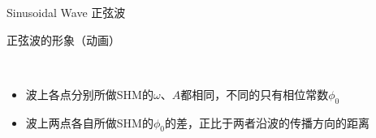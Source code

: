 \documentclass{beamer}
\begin{document}
\begin{frame}{Sinusoidal Wave 正弦波}
	\begin{block}{正弦波的形象（动画）}
		\begin{center}
		\href{run:./LectureNotePics/Transverse.gif}{}\\
		\end{center}
	\end{block}
	
	\begin{itemize}
		\item 波上各点分别所做SHM的$\omega$、$A$都相同，不同的只有相位常数$\phi_0$
		\item 波上两点各自所做SHM的$\phi_0$的差，正比于两者沿波的传播方向的距离
	\end{itemize}
\end{frame}
\end{document}
